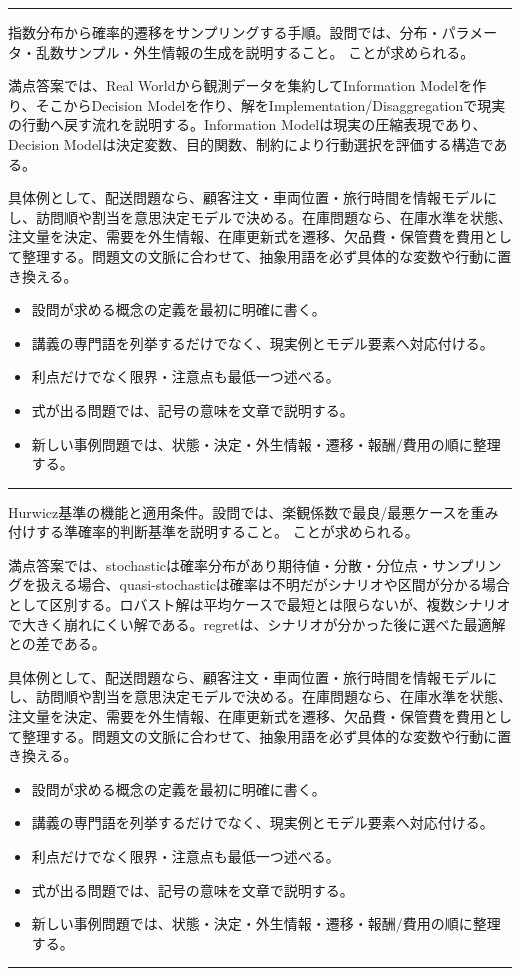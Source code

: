 \vspace{2mm}\hrule\vspace{2mm}
指数分布から確率的遷移をサンプリングする手順。設問では、分布・パラメータ・乱数サンプル・外生情報の生成を説明すること。 ことが求められる。\par
{}
満点答案では、Real Worldから観測データを集約してInformation Modelを作り、そこからDecision Modelを作り、解をImplementation/Disaggregationで現実の行動へ戻す流れを説明する。Information Modelは現実の圧縮表現であり、Decision Modelは決定変数、目的関数、制約により行動選択を評価する構造である。\par
{}
具体例として、配送問題なら、顧客注文・車両位置・旅行時間を情報モデルにし、訪問順や割当を意思決定モデルで決める。在庫問題なら、在庫水準を状態、注文量を決定、需要を外生情報、在庫更新式を遷移、欠品費・保管費を費用として整理する。問題文の文脈に合わせて、抽象用語を必ず具体的な変数や行動に置き換える。\par
{}
\begin{itemize}
\item 設問が求める概念の定義を最初に明確に書く。
\item 講義の専門語を列挙するだけでなく、現実例とモデル要素へ対応付ける。
\item 利点だけでなく限界・注意点も最低一つ述べる。
\item 式が出る問題では、記号の意味を文章で説明する。
\item 新しい事例問題では、状態・決定・外生情報・遷移・報酬/費用の順に整理する。
\end{itemize}
\vspace{2mm}\hrule\vspace{2mm}
Hurwicz基準の機能と適用条件。設問では、楽観係数で最良/最悪ケースを重み付けする準確率的判断基準を説明すること。 ことが求められる。\par
{}
満点答案では、stochasticは確率分布があり期待値・分散・分位点・サンプリングを扱える場合、quasi-stochasticは確率は不明だがシナリオや区間が分かる場合として区別する。ロバスト解は平均ケースで最短とは限らないが、複数シナリオで大きく崩れにくい解である。regretは、シナリオが分かった後に選べた最適解との差である。\par
{}
具体例として、配送問題なら、顧客注文・車両位置・旅行時間を情報モデルにし、訪問順や割当を意思決定モデルで決める。在庫問題なら、在庫水準を状態、注文量を決定、需要を外生情報、在庫更新式を遷移、欠品費・保管費を費用として整理する。問題文の文脈に合わせて、抽象用語を必ず具体的な変数や行動に置き換える。\par
{}
\begin{itemize}
\item 設問が求める概念の定義を最初に明確に書く。
\item 講義の専門語を列挙するだけでなく、現実例とモデル要素へ対応付ける。
\item 利点だけでなく限界・注意点も最低一つ述べる。
\item 式が出る問題では、記号の意味を文章で説明する。
\item 新しい事例問題では、状態・決定・外生情報・遷移・報酬/費用の順に整理する。
\end{itemize}
\vspace{2mm}\hrule\vspace{2mm}